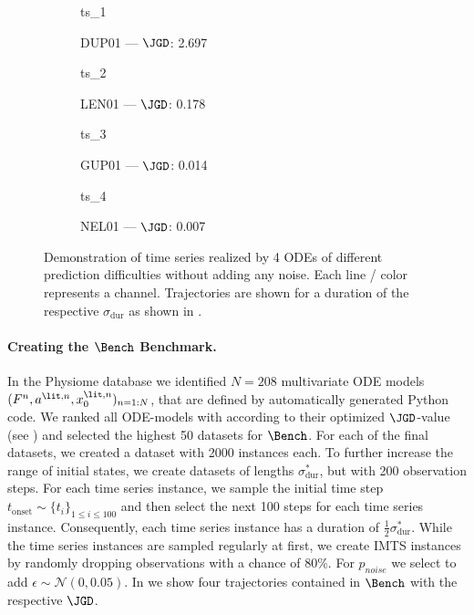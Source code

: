 \begin{figure}
	\centering%
	\begin{subfigure}{0.495\textwidth}%
		\centering%
		{ts_1}%
		\caption*{DUP01 --- $\JGD$: 2.697}%
	\end{subfigure}
	\begin{subfigure}{0.495\textwidth}%
		\centering%
		{ts_2}%
		\caption*{LEN01 --- $\JGD$: 0.178}
	\end{subfigure}

	\begin{subfigure}{0.495\linewidth}%
		\centering%
		{ts_3}%
		\caption*{GUP01 --- $\JGD$: 0.014}
	\end{subfigure}
	\begin{subfigure}{0.495\linewidth}%
		\centering%
		{ts_4}%
		\caption*{NEL01 --- $\JGD$: 0.007}
	\end{subfigure}
	\caption{Demonstration of time series realized by 4 ODEs of different prediction difficulties without adding any noise. Each line / color represents a channel. 
	Trajectories are shown for a duration of the respective $\sigma_\text{dur}$ as shown in .}\label{fig:plots}
\end{figure}


\paragraph{Creating the $\Bench$ Benchmark.}\label{sec:rejection}
In the Physiome database we identified $N=208$ multivariate ODE models
${(F^n,a^{\lit,n},x_0^{\lit,n})_{n=1:N}}$, that are defined by
automatically generated Python code.
We ranked all ODE-models with according to their optimized $\JGD$-value
(see ) and selected the highest 50 datasets for
$\Bench$.
For each of the final datasets, we created a dataset with 2000 instances each.
To further increase the range of initial states, we create datasets of lengths
${\sigma^*_{\text{dur}}}$, but with 200 observation steps.
For each time series instance, we sample the initial time step
${t_\text{onset} \sim \{t_i\}_{1\leq i \leq 100}}$
and then select the next 100 steps for each time series instance.
Consequently, each time series instance has a duration of ${\frac{1}{2}\sigma^*_\text{dur}}$.
While the time series instances are sampled regularly at first,
we create IMTS instances by randomly dropping observations with a chance of 80\%.
For $p_{noise}$ we select to add $\epsilon \sim \mathcal{N} (0,0.05)$.
In  we show four trajectories contained in $\Bench$ with the
respective $\JGD$.


